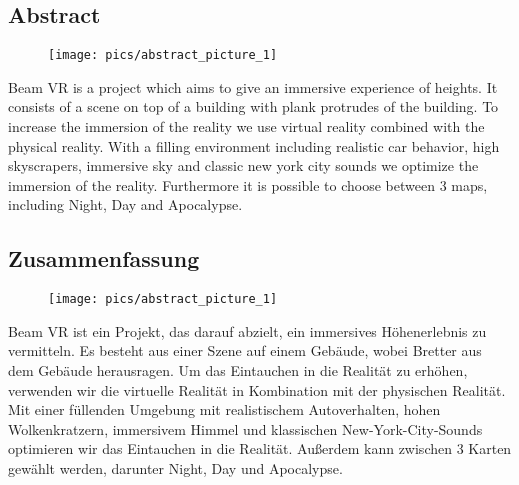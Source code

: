 \begin{spacing}{1}

    \chapter*{Abstract}

\end{spacing}

\begin{wrapfigure}{r}{0.3\textwidth}

    \begin{center}

        \texttt{[image: pics/abstract\_picture\_1]}

    \end{center}

\end{wrapfigure}

Beam VR is a project which aims to give an immersive experience of heights.
It consists of a scene on top of a building with plank protrudes of the building.
To increase the immersion of the reality we use virtual reality combined with the physical reality.
With a filling environment including realistic car behavior, high skyscrapers, immersive sky and classic new york city sounds we optimize the immersion of the reality.
Furthermore it is possible to choose between 3 maps, including Night, Day and Apocalypse.

\newpage

\begin{spacing}{1}

    \chapter*{Zusammenfassung}

\end{spacing}

\begin{wrapfigure}{r}{0.3\textwidth}

    \begin{center}

        \texttt{[image: pics/abstract\_picture\_1]}

    \end{center}

\end{wrapfigure}

Beam VR ist ein Projekt, das darauf abzielt, ein immersives Höhenerlebnis zu vermitteln.
Es besteht aus einer Szene auf einem Gebäude, wobei Bretter aus dem Gebäude herausragen.
Um das Eintauchen in die Realität zu erhöhen, verwenden wir die virtuelle Realität in Kombination mit der physischen Realität.
Mit einer füllenden Umgebung mit realistischem Autoverhalten, hohen Wolkenkratzern, immersivem Himmel und klassischen New-York-City-Sounds optimieren wir das Eintauchen in die Realität.
Außerdem kann zwischen 3 Karten gewählt werden, darunter Night, Day und Apocalypse.
